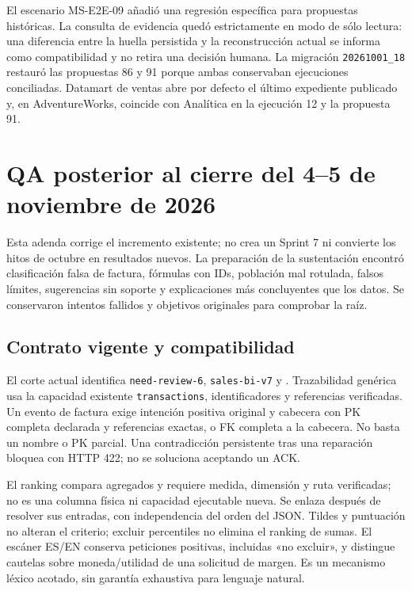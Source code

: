 \documentclass[11pt,letterpaper]{article}
\newcommand{\file}[1]{\texttt{#1}}
\begin{document}
El escenario MS-E2E-09 añadió una regresión específica para propuestas históricas. La
consulta de evidencia quedó estrictamente en modo de sólo lectura: una diferencia entre la
huella persistida y la reconstrucción actual se informa como compatibilidad y no retira una
decisión humana. La migración \file{20261001\_18} restauró las propuestas 86 y 91 porque
ambas conservaban ejecuciones conciliadas. Datamart de ventas abre por defecto el último
expediente publicado y, en AdventureWorks, coincide con Analítica en la ejecución 12 y la
propuesta 91.

\section{QA posterior al cierre del 4--5 de noviembre de 2026}

Esta adenda corrige el incremento existente; no crea un Sprint 7 ni convierte los
hitos de octubre en resultados nuevos. La preparación de la sustentación encontró
clasificación falsa de factura, fórmulas con IDs, población mal rotulada, falsos
límites, sugerencias sin soporte y explicaciones más concluyentes que los datos.
Se conservaron intentos fallidos y objetivos originales para comprobar la raíz.

\subsection{Contrato vigente y compatibilidad}

El corte actual identifica \file{need-review-6}, \file{sales-bi-v7} y
. Trazabilidad genérica usa la capacidad existente
\file{transactions}, identificadores y referencias verificadas. Un evento de
factura exige intención positiva original y cabecera con PK completa declarada y
referencias exactas, o FK completa a la cabecera. No basta un nombre o PK parcial.
Una contradicción persistente tras una reparación bloquea con HTTP 422; no se
soluciona aceptando un ACK.

El ranking compara agregados y requiere medida, dimensión y ruta verificadas;
no es una columna física ni capacidad ejecutable nueva. Se enlaza después de
resolver sus entradas, con independencia del orden del JSON. Tildes y puntuación
no alteran el criterio; excluir percentiles no elimina el ranking de sumas.
El escáner ES/EN conserva peticiones positivas, incluidas «no excluir», y distingue
cautelas sobre moneda/utilidad de una solicitud de margen. Es un mecanismo léxico
acotado, sin garantía exhaustiva para lenguaje natural.
\end{document}
